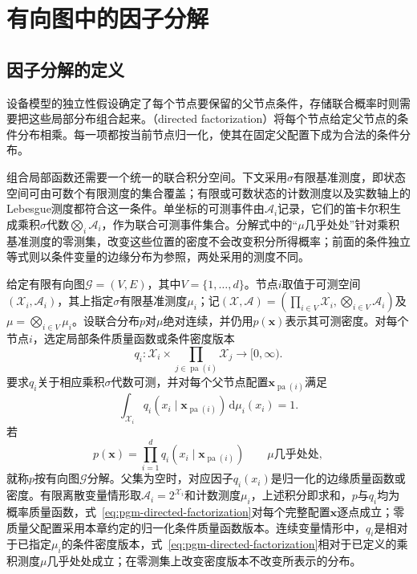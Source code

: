 \endgroup

\section{有向图中的因子分解}
\label{sec:pgm-directed-factorization}

\subsection{因子分解的定义}
\label{sec:pgm-directed-factor-definition}

设备模型的独立性假设确定了每个节点要保留的父节点条件，存储联合概率时则需要把这些局部分布组合起来。（directed factorization）将每个节点给定父节点的条件分布相乘。每一项都按当前节点归一化，使其在固定父配置下成为合法的条件分布。

组合局部函数还需要一个统一的联合积分空间。下文采用$\sigma$有限基准测度，即状态空间可由可数个有限测度的集合覆盖；有限或可数状态的计数测度以及实数轴上的Lebesgue测度都符合这一条件。单坐标的可测事件由$\mathcal A_i$记录，它们的笛卡尔积生成乘积$\sigma$代数$\bigotimes_i\mathcal A_i$，作为联合可测事件集合。分解式中的“$\mu$几乎处处”针对乘积基准测度的零测集，改变这些位置的密度不会改变积分所得概率；前面的条件独立等式则以条件变量的边缘分布为参照，两处采用的测度不同。

\begin{definition}[按有向图分解]
  \label{def:pgm-directed-factorization}
  给定有限有向图$\mathcal{G}=(V,E)$，其中$V=\{1,\ldots,d\}$。节点$i$取值于可测空间$(\mathcal{X}_i,\mathcal{A}_i)$，其上指定$\sigma$有限基准测度$\mu_i$；记$(\mathcal{X},\mathcal{A})=(\prod_{i\in V}\mathcal{X}_i,\bigotimes_{i\in V}\mathcal{A}_i)$及$\mu=\bigotimes_{i\in V}\mu_i$。设联合分布$p$对$\mu$绝对连续，并仍用$p(\bm{x})$表示其可测密度。对每个节点$i$，选定局部条件质量函数或条件密度版本
  \[
    q_i:
    \mathcal{X}_i\times
    \prod_{j\in\operatorname{pa}(i)}\mathcal{X}_j
    \longrightarrow[0,\infty).
  \]
  要求$q_i$关于相应乘积$\sigma$代数可测，并对每个父节点配置$\bm{x}_{\operatorname{pa}(i)}$满足
  \[
    \int_{\mathcal{X}_i}
    q_i(x_i\mid\bm{x}_{\operatorname{pa}(i)})\,\mathrm{d}\mu_i(x_i)=1.
  \]
  若
  \begin{equation}
    p(\bm{x})=\prod_{i=1}^{d}
      q_i(x_i\mid\bm{x}_{\operatorname{pa}(i)})
      \qquad\text{$\mu$几乎处处},
    \label{eq:pgm-directed-factorization}
  \end{equation}
  就称$p$按有向图$\mathcal{G}$分解。父集为空时，对应因子$q_i(x_i)$是归一化的边缘质量函数或密度。有限离散变量情形取$\mathcal{A}_i=2^{\mathcal{X}_i}$和计数测度$\mu_i$，上述积分即求和，$p$与$q_i$均为概率质量函数，式~\eqref{eq:pgm-directed-factorization}对每个完整配置$\bm{x}$逐点成立；零质量父配置采用本章约定的归一化条件质量函数版本。连续变量情形中，$q_i$是相对于已指定$\mu_i$的条件密度版本，式~\eqref{eq:pgm-directed-factorization}相对于已定义的乘积测度$\mu$几乎处处成立；在零测集上改变密度版本不改变所表示的分布。
\end{definition}

